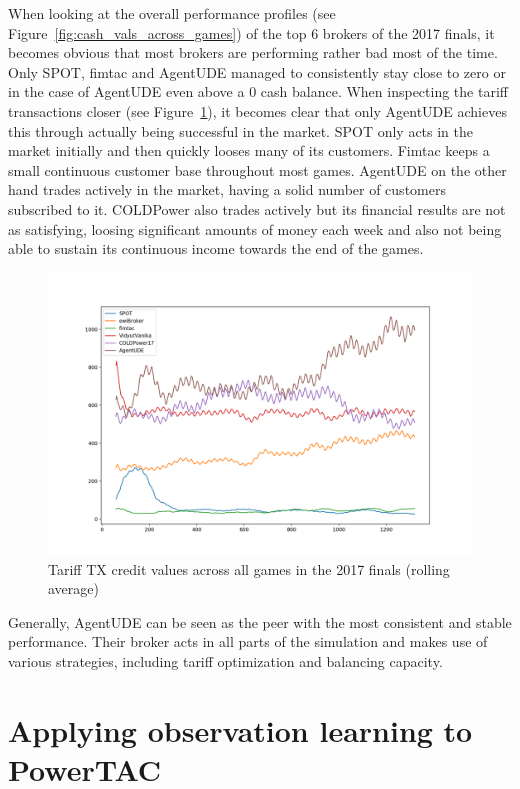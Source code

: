 When looking at the overall performance profiles (see Figure~\ref{fig:cash_vals_across_games}) of the top 6 brokers of
the 2017 finals, it becomes obvious that most brokers are performing rather bad most of the time. Only SPOT, fimtac and
AgentUDE managed to consistently stay close to zero or in the case of AgentUDE even above a 0 cash balance. When
inspecting the tariff transactions closer (see Figure~\ref{fig:allttxucline}), it becomes clear that only AgentUDE
achieves this through actually being successful in the market. SPOT only acts in the market initially and then quickly
looses many of its customers. Fimtac keeps a small continuous customer base throughout most games. AgentUDE on the other
hand trades actively in the market, having a solid number of customers subscribed to it.  COLDPower also trades actively
but its financial results are not as satisfying, loosing significant amounts of money each week and also not being able
to sustain its continuous income towards the end of the games.
\begin{figure}[]
    \centering
    \includegraphics[width=1.0\linewidth]{img/all-ttx-uc-line.png}
    \caption{Tariff TX credit values across all games in the 2017 finals (rolling average)}
    \label{fig:allttxucline}
\end{figure}

Generally, AgentUDE can be seen as the peer with the most consistent and stable performance. Their broker acts in all
parts of the simulation and makes use of various strategies, including tariff optimization and balancing capacity.

\section{Applying observation learning to PowerTAC}%
\label{sub:applying_observation_learning_to_powertac}

